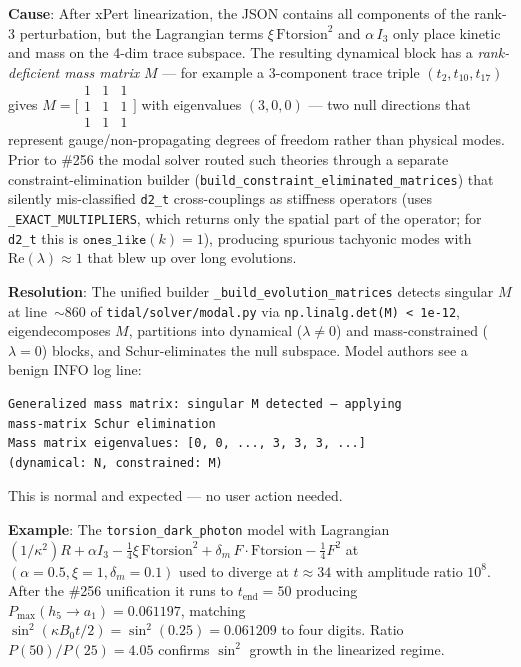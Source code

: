 \textbf{Cause}: After xPert linearization, the JSON contains all components of the rank-3 perturbation, but the Lagrangian terms $\xi\,\mathrm{Ftorsion}^2$ and $\alpha\,I_3$ only place kinetic and mass on the 4-dim trace subspace. The resulting dynamical block has a \emph{rank-deficient mass matrix} $M$ --- for example a 3-component trace triple $(t_2, t_{10}, t_{17})$ gives $M = \bigl[\begin{smallmatrix} 1 & 1 & 1 \\ 1 & 1 & 1 \\ 1 & 1 & 1 \end{smallmatrix}\bigr]$ with eigenvalues $(3, 0, 0)$ --- two null directions that represent gauge/non-propagating degrees of freedom rather than physical modes. Prior to \#256 the modal solver routed such theories through a separate constraint-elimination builder (\texttt{build\_constraint\_eliminated\_matrices}) that silently mis-classified \texttt{d2\_t} cross-couplings as stiffness operators (uses \texttt{\_EXACT\_MULTIPLIERS}, which returns only the spatial part of the operator; for \texttt{d2\_t} this is $\mathtt{ones\_like}(k)=1$), producing spurious tachyonic modes with $\mathrm{Re}(\lambda) \approx 1$ that blew up over long evolutions.

\textbf{Resolution}: The unified builder \texttt{\_build\_evolution\_matrices} detects singular $M$ at line~$\sim$860 of \texttt{tidal/solver/modal.py} via \texttt{np.linalg.det(M) < 1e-12}, eigendecomposes $M$, partitions into dynamical ($\lambda \neq 0$) and mass-constrained ($\lambda = 0$) blocks, and Schur-eliminates the null subspace. Model authors see a benign INFO log line:
\begin{verbatim}
Generalized mass matrix: singular M detected — applying
mass-matrix Schur elimination
Mass matrix eigenvalues: [0, 0, ..., 3, 3, 3, ...]
(dynamical: N, constrained: M)
\end{verbatim}
This is normal and expected --- no user action needed.

\textbf{Example}: The \texttt{torsion\_dark\_photon} model with Lagrangian $(1/\kappa^2) R + \alpha I_3 - \frac{1}{4}\xi\,\mathrm{Ftorsion}^2 + \delta_m\,F\cdot\mathrm{Ftorsion} - \frac{1}{4}F^2$ at $(\alpha{=}0.5,\xi{=}1,\delta_m{=}0.1)$ used to diverge at $t \approx 34$ with amplitude ratio $10^{8}$. After the \#256 unification it runs to $t_\mathrm{end}=50$ producing $P_\mathrm{max}(h_5\to a_1) = 0.061197$, matching $\sin^2(\kappa B_0 t/2) = \sin^2(0.25) = 0.061209$ to four digits. Ratio $P(50)/P(25) = 4.05$ confirms $\sin^2$ growth in the linearized regime.

